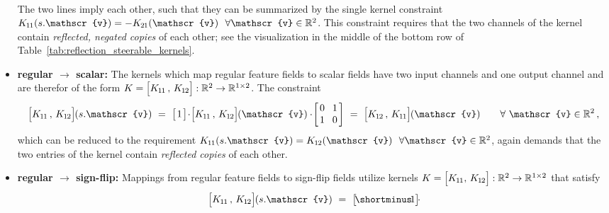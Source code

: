 \begin{itemize}
\begin{align}
        \end{align}
        The two lines imply each other, such that they can be summarized by the single kernel constraint
        ${\Koo(s.\mathscr{v}) = -\Kto(\mathscr{v})}\ \ \forall \mathscr{v}\in \R^2$.
        This constraint requires that the two channels of the kernel contain \emph{reflected, negated copies} of each other; see the visualization in the middle of the bottom row of Table~\ref{tab:reflection_steerable_kernels}.
    \item[{\rule[2.0pt]{2pt}{2pt}}]
    \textbf{regular $\bm\to$ scalar:}
        The kernels which map regular feature fields to scalar fields have two input channels and one output channel and are therefor of the form
        $K = \pig[\Koo \,,\, \Kot\pig]: \R^2 \to \R^{1\times2}$.
        The constraint
        \begin{align}
                \pig[\Koo \,,\, \Kot\pig] \mkern-1mu (s.\mathscr{v})
            \ =\ 
                \big[\mkern2mu 1 \mkern2mu\big]
                \!\cdot\!
                \pig[\Koo \,,\, \Kot\pig] \mkern-1mu (\mathscr{v})
                \cdot\!
                \begin{bmatrix} \hspace{1.5pt} 0 &\mkern-4mu 1 \hspace*{1.5pt} \\ \hspace{1.5pt} 1 &\mkern-4mu 0 \hspace*{1.5pt} \end{bmatrix}
            \ =\ 
                \pig[\Kot \,,\, \Koo\pig] \mkern-1mu (\mathscr{v})
            \qquad \forall\ \mathscr{v} \in \R^2 \,,
        \end{align}
        which can be reduced to the requirement
        $\Koo(s.\mathscr{v}) = \Kot(\mathscr{v})\ \ \forall \mathscr{v} \in \R^2$,
        again demands that the two entries of the kernel contain \emph{reflected copies} of each other.
    \item[{\rule[2.0pt]{2pt}{2pt}}]
    \textbf{regular $\bm\to$ sign-flip:}
        Mappings from regular feature fields to sign-flip fields utilize kernels
        $K = \pig[\Koo,\, \Kot\pig]: \R^2 \to \R^{1\times2}$
        that satisfy
        \begin{align}
                \pig[\Koo \,,\, \Kot\pig] \mkern-1mu (s.\mathscr{v})
            \ =\ 
                \big[\! \shortminus\!1 \big]
                \!\cdot\!

\end{align}
\end{itemize}
